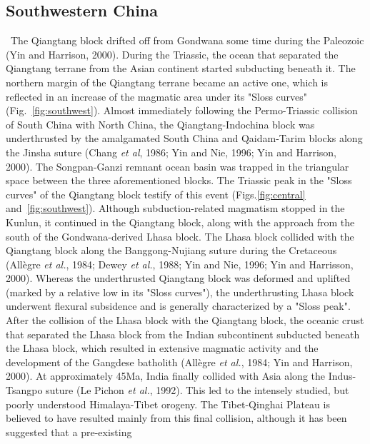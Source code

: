 \documentclass{article}
\begin{document}
 \subsection*{Southwestern China} \label{sec:southwest}
 ~\indent  The Qiangtang  block  drifted off  from  Gondwana some  time
 during the Paleozoic (Yin  and Harrison, 2000).  During the Triassic,
 the  ocean  that  separated  the  Qiangtang terrane  from  the  Asian
 continent started  subducting beneath it. The northern  margin of the
 Qiangtang  terrane became  an active  one, which  is reflected  in an
 increase   of   the   magmatic   area  under   its   "Sloss   curves"
 (Fig.~\ref{fig:southwest}).    Almost   immediately   following   the
 Permo-Triassic  collision  of  South  China  with  North  China,  the
 Qiangtang-Indochina block was  underthrusted by the amalgamated South
 China and Qaidam-Tarim blocks along  the Jinsha suture (Chang {\it et
 al},  1986;  Yin  and  Nie,  1996;  Yin  and  Harrison,  2000).   The
 Songpan-Ganzi remnant ocean basin was trapped in the triangular space
 between  the three aforementioned  blocks. The  Triassic peak  in the
 "Sloss  curves"  of  the   Qiangtang  block  testify  of  this  event
 (Figs.\ref{fig:central}      and~\ref{fig:southwest}).       Although
 subduction-related magmatism  stopped in the Kunlun,  it continued in
 the Qiangtang  block, along with the  approach from the  south of the
 Gondwana-derived  Lhasa  block. The  Lhasa  block  collided with  the
 Qiangtang  block   along  the  Banggong-Nujiang   suture  during  the
 Cretaceous (All\`egre {\it et al.}, 1984; Dewey {\it et al.}, 1988; Yin
 and Nie,  1996; Yin and Harrisson, 2000).   Whereas the underthrusted
 Qiangtang block was  deformed and uplifted (marked by  a relative low
 in  its "Sloss  curves"),  the underthrusting  Lhasa block  underwent
 flexural subsidence and is generally characterized by a "Sloss peak".
 After the collision of the  Lhasa block with the Qiangtang block, the
 oceanic  crust  that  separated  the  Lhasa  block  from  the  Indian
 subcontinent  subducted beneath  the Lhasa  block, which  resulted in
 extensive  magmatic  activity and  the  development  of the  Gangdese
 batholith (All\`egre {\it et al.},  1984; Yin and Harrison, 2000).  At
 approximately  45Ma,  India  finally  collided with  Asia  along  the
 Indus-Tsangpo suture (Le  Pichon {\it et al.}, 1992).  This led to the
 intensely studied, but poorly understood Himalaya-Tibet orogeny.  The
 Tibet-Qinghai Plateau  is believed to have resulted  mainly from this
 final collision,  although it has been suggested  that a pre-existing
\end{document}
